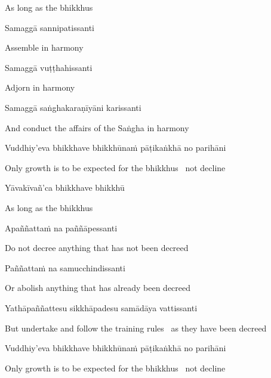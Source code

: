 \begin{english}
  As long as the bhikkhus
\end{english}

Samaggā sannipatissanti

\begin{english}
  Assemble in harmony
\end{english}

Samaggā vuṭṭhahissanti

\begin{english}
  Adjorn in harmony
\end{english}

Samaggā saṅghakaraṇīyāni karissanti

\begin{english}
  And conduct the affairs of the Saṅgha in harmony
\end{english}

Vuddhiy'eva bhikkhave bhikkhūnaṁ pāṭikaṅkhā no parihāni

\begin{english}
  Only growth is to be expected for the bhikkhus \breathmark\ not decline
\end{english}

Yāvakīvañ'ca bhikkhave bhikkhū

\begin{english}
  As long as the bhikkhus
\end{english}

Apaññattaṁ na paññāpessanti

\begin{english}
  Do not decree anything that has not been decreed
\end{english}

Paññattaṁ na samucchindissanti

\begin{english}
  Or abolish anything that has already been decreed
\end{english}

Yathāpaññattesu sikkhāpadesu samādāya vattissanti

\begin{english-hang}
  But undertake and follow the training rules \breathmark\ as they have been decreed
\end{english-hang}

Vuddhiy'eva bhikkhave bhikkhūnaṁ pāṭikaṅkhā no parihāni

\begin{english}
  Only growth is to be expected for the bhikkhus \breathmark\ not decline
\end{english}

